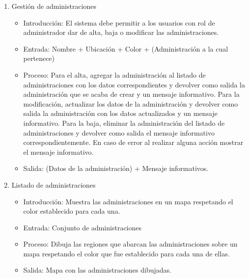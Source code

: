 \begin{enumerate}
			\item Gestión de administraciones
				\begin{itemize}
					\item Introducción: El sistema debe permitir a los usuarios con rol de administrador dar de alta, baja o modificar las administraciones.
					\item Entrada: Nombre + Ubicación + Color + (Administración a la cual pertenece)
					\item Proceso: Para el alta, agregar la administración al listado de administraciones con los datos correspondientes y devolver como salida la administración que se acaba de crear y un mensaje informativo. Para la modificación, actualizar los datos de la administración y devolver como salida la administración con los datos actualizados y un mensaje informativo. Para la baja, eliminar la administración del listado de administraciones y devolver como salida el mensaje informativo correspondientemente. En caso de error al realizar alguna acción mostrar el mensaje informativo.
					\item Salida: (Datos de la administración) + Mensaje informativos.
				\end{itemize}
			
			\item Listado de administraciones
				\begin{itemize}
					\item Introducción: Muestra las administraciones en un mapa respetando el color establecido para cada una.
					\item Entrada: Conjunto de administraciones
					\item Proceso: Dibuja las regiones que abarcan las administraciones sobre un mapa respetando el color que fue establecido para cada una de ellas.
					\item Salida: Mapa con las administraciones dibujadas.
				\end{itemize}
				

\end{enumerate}
